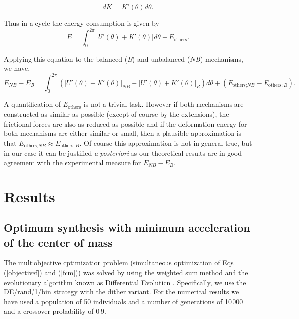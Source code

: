 \documentclass[11pt]{article}
\begin{document}
\begin{equation}
dK =  K'(\theta) d\theta.
\end{equation}

Thus in a cycle the energy consumption is given by
\begin{equation}\label{Ecoms}
E=\int_0^{2\pi} |U'(\theta) + K'(\theta)|d\theta + E_{\text{others}}.
\end{equation}

Applying this equation to  the balanced ($B$) and unbalanced ($NB$) 
mechanisms, we have,
\begin{equation}\label{DEcoms}
E_{NB}-E_{B} = \int_0^{2\pi} \left(|U'(\theta) + K'(\theta)|_{NB}
- |U'(\theta) + K'(\theta)|_{B} \right)
d\theta  + (E_{\text{others;}NB} -E_{\text{others};B}).
\end{equation} 

A quantification of $ E_{\text{others}}$ is not a trivial task. However
if both mechanisms are constructed as similar as possible (except of 
course by the extensions), the frictional forces are also as reduced as 
possible and if  the deformation energy for both mechanisms are either 
similar or small, then a plausible approximation is that 
$E_{\text{others;}NB} \approx E_{\text{others};B}$. Of course this 
approximation is not in general true, but in our case it can be 
justified\emph{ a posteriori} as our theoretical results are in good 
agreement  with the experimental measure for $E_{NB}-E_{B}$. 


\section{Results}\label{Results}


\subsection{Optimum synthesis with minimum acceleration of the center of 
mass}
The multiobjective optimization problem (simultaneous optimization of 
Eqs. (\ref{objectivef}) and (\ref{fcm})) was solved by using the 
weighted sum method and the evolutionary algorithm known as Differential 
Evolution \cite{Price_Storn2005}. Specifically, we use the DE/rand/1/bin 
strategy with the dither variant. For the numerical results we have used 
a population of 50 individuals and a number of generations of 10\,000 and 
a crossover probability of 0.9.
  
\end{document}
